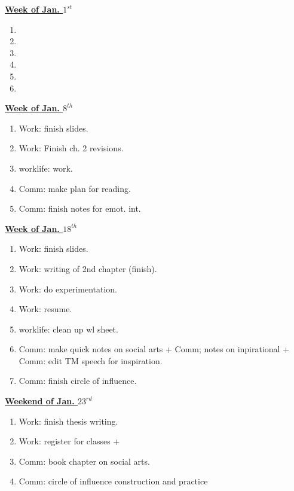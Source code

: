 \documentclass[11pt]{article}
\begin{document}
           {\small \underline{\textbf{Week of Jan. $1^{st}$}}}\\
           \begin{enumerate}
             \small \item \small
           \item \small 
           \item \small
           \item \small 
           \item \small
           \item \small 
           \end{enumerate}   
           {\small \underline{\textbf{Week of Jan. $8^{th}$}}}\\
           \begin{enumerate}
           \small \item \small Work: finish slides. 
            \item \small Work: Finish ch. 2 revisions. 
            \item \small worklife: work. 
            \item \small Comm: make plan for reading. 
            \item \small Comm: finish notes for emot. int. 
           \end{enumerate}
           
           {\small \underline{\textbf{Week of Jan. $18^{th}$}} }\\
           \begin{enumerate} 
             \small \item \small Work: finish slides. 
           \item \small Work: writing of 2nd chapter (finish).
           \item \small Work: do experimentation. 
           \item \small Work: resume. 
           \item \small worklife: clean up wl sheet. 
           \item \small Comm: make quick notes on social arts + Comm; notes on inpirational + Comm: edit TM speech for inspiration. 
           \item \small Comm: finish circle of influence. 
           \end{enumerate} 
                   
            {\small \underline{\textbf{Weekend of Jan. $23^{rd}$}} }\\
           \begin{enumerate} 
             \small \item \small Work: finish thesis writing. 
             \item \small Work: register for classes + 
             \item \small Comm: book chapter on social arts. 
             \item \small Comm: circle of influence construction and practice 
           \end{enumerate}
\end{document}
